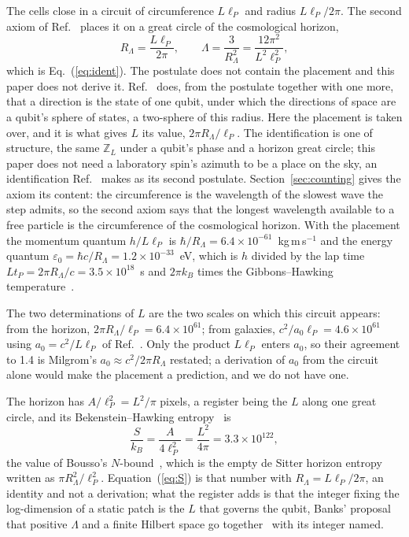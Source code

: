 \documentclass[aps,prd,twocolumn,superscriptaddress,nofootinbib]{revtex4-2}
\begin{document}
The cells close in a circuit of circumference $L\ell_P$ and radius $L\ell_P/2\pi$. The second axiom of Ref.~\cite{korytko2026} places it on a great circle of the cosmological horizon,
\begin{equation}
R_\Lambda = \frac{L\ell_P}{2\pi}, \qquad \Lambda = \frac{3}{R_\Lambda^2} = \frac{12\pi^2}{L^2\ell_P^2},
\label{eq:closure}
\end{equation}
which is Eq.~(\ref{eq:ident}). The postulate does not contain the placement and this paper does not derive it. Ref.~\cite{korytko2026d} does, from the postulate together with one more, that a direction is the state of one qubit, under which the directions of space are a qubit's sphere of states, a two-sphere of this radius. Here the placement is taken over, and it is what gives $L$ its value, $2\pi R_\Lambda/\ell_P$. The identification is one of structure, the same $\mathbb{Z}_L$ under a qubit's phase and a horizon great circle; this paper does not need a laboratory spin's azimuth to be a place on the sky, an identification Ref.~\cite{korytko2026d} makes as its second postulate. Section~\ref{sec:counting} gives the axiom its content: the circumference is the wavelength of the slowest wave the step admits, so the second axiom says that the longest wavelength available to a free particle is the circumference of the cosmological horizon. With the placement the momentum quantum $h/L\ell_P$ is $\hbar/R_\Lambda = 6.4\times10^{-61}$~kg\,m\,s$^{-1}$ and the energy quantum $\varepsilon_0 = \hbar c/R_\Lambda = 1.2\times10^{-33}$~eV, which is $h$ divided by the lap time $Lt_P = 2\pi R_\Lambda/c = 3.5\times10^{18}$~s and $2\pi k_B$ times the Gibbons--Hawking temperature~\cite{gibbons1977}.

The two determinations of $L$ are the two scales on which this circuit appears: from the horizon, $2\pi R_\Lambda/\ell_P = 6.4\times10^{61}$; from galaxies, $c^2/a_0\ell_P = 4.6\times10^{61}$ using $a_0 = c^2/L\ell_P$ of Ref.~\cite{korytko2026}. Only the product $L\ell_P$ enters $a_0$, so their agreement to 1.4 is Milgrom's $a_0 \approx c^2/2\pi R_\Lambda$ restated; a derivation of $a_0$ from the circuit alone would make the placement a prediction, and we do not have one.

The horizon has $A/\ell_P^2 = L^2/\pi$ pixels, a register being the $L$ along one great circle, and its Bekenstein--Hawking entropy~\cite{bekenstein1973} is
\begin{equation}
\frac{S}{k_B} = \frac{A}{4\ell_P^2} = \frac{L^2}{4\pi} = 3.3\times10^{122},
\label{eq:S}
\end{equation}
the value of Bousso's $N$-bound~\cite{bousso2000,bousso1999b}, which is the empty de Sitter horizon entropy written as $\pi R_\Lambda^2/\ell_P^2$. Equation~(\ref{eq:S}) is that number with $R_\Lambda = L\ell_P/2\pi$, an identity and not a derivation; what the register adds is that the integer fixing the log-dimension of a static patch is the $L$ that governs the qubit, Banks' proposal that positive $\Lambda$ and a finite Hilbert space go together~\cite{banks2000} with its integer named.
\end{document}
